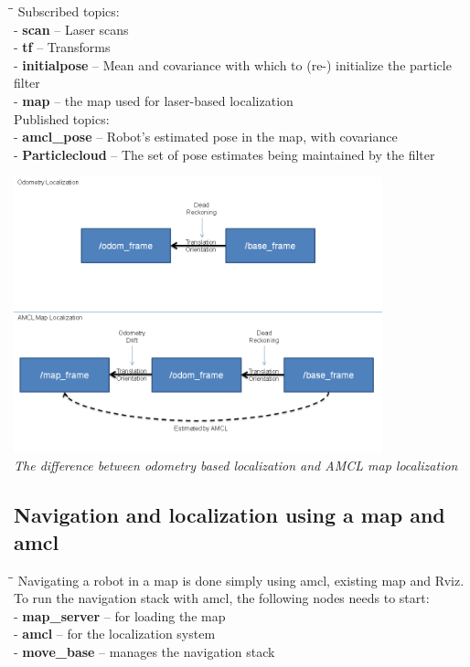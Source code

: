 \documentclass[10pt,a4paper]{article}
\begin{document}
\begin{tabbing}
\hspace{1cm}\=\hspace{1cm}\=\kill
Subscribed topics:\\
\> - \textbf{scan} – Laser scans\\
\> - \textbf{tf} – Transforms\\
\> - \textbf{initialpose} – Mean and covariance with which to (re-) initialize the particle filter \\
\> - \textbf{map} – the map used for laser-based localization \\

Published topics:\\
\> - \textbf{amcl\_pose} – Robot's estimated pose in the map, with covariance\\
\> - \textbf{Particlecloud} – The set of pose estimates being maintained by the filter\\
\end{tabbing}

\begin{center}
\includegraphics[width=0.8\textwidth]{images/amcl_localization.png}\\
\textit{The difference between odometry based localization and AMCL map localization}
\end{center}

\subsection{Navigation and localization using a map and amcl}

\begin{tabbing}
\hspace{1cm}\=\hspace{1cm}\=\kill
Navigating a robot in a map is done simply using amcl, existing map and Rviz. To run the navigation stack with amcl,  the following nodes needs to start: \\
\> -\textbf{ map\_server }– for loading the map\\
\> - \textbf{amcl} – for the localization system\\
\> - \textbf{move\_base} – manages the navigation stack\\
\end{tabbing}
\end{document}
